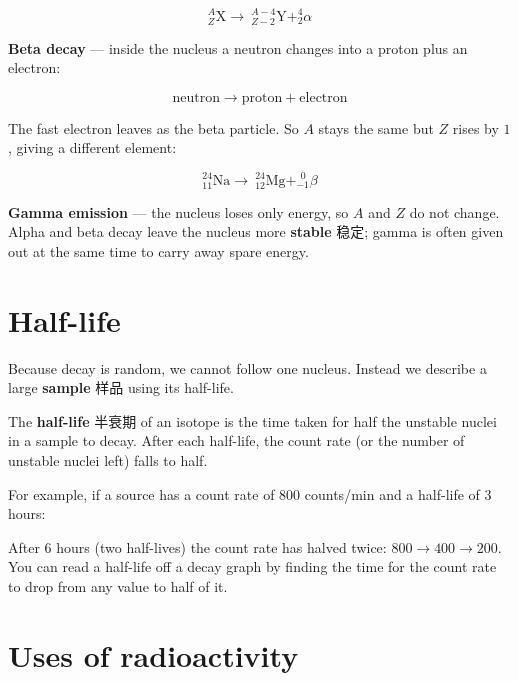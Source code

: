 \documentclass[11pt]{article}
\begin{document}
\[
^{A}_{Z}\text{X} \rightarrow\ ^{A-4}_{Z-2}\text{Y} + ^{4}_{2}\alpha
\]

\textbf{Beta decay} — inside the nucleus a neutron changes into a proton plus an electron:

\[
\text{neutron} \rightarrow \text{proton} + \text{electron}
\]

The fast electron leaves as the beta particle. So $A$ stays the same but $Z$ rises by $1$, giving a different element:

\[
^{24}_{11}\text{Na} \rightarrow\ ^{24}_{12}\text{Mg} + ^{\ \ 0}_{-1}\beta
\]

\textbf{Gamma emission} — the nucleus loses only energy, so $A$ and $Z$ do not change. Alpha and beta decay leave the nucleus more \textbf{stable} 稳定; gamma is often given out at the same time to carry away spare energy.

\section*{Half-life}

Because decay is random, we cannot follow one nucleus. Instead we describe a large \textbf{sample} 样品 using its half-life.

The \textbf{half-life} 半衰期 of an isotope is the time taken for half the unstable nuclei in a sample to decay. After each half-life, the count rate (or the number of unstable nuclei left) falls to half.

For example, if a source has a count rate of $800$ counts/min and a half-life of $3$ hours:

\begin{center}
\end{center}

After $6$ hours (two half-lives) the count rate has halved twice: $800 \to 400 \to 200$. You can read a half-life off a decay graph by finding the time for the count rate to drop from any value to half of it.

\section*{Uses of radioactivity}
\end{document}
